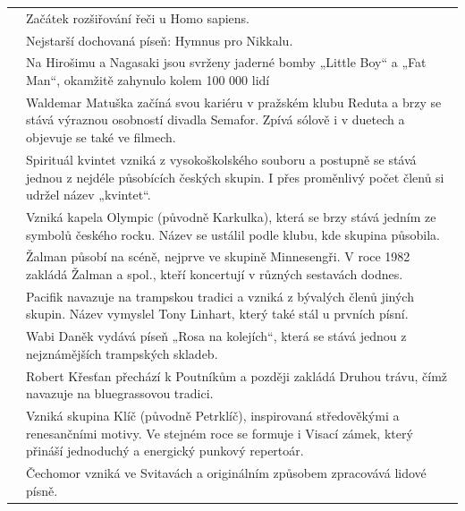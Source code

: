 
\renewcommand{\arraystretch}{0.7} 
\setlength{\extrarowheight}{15pt}  
\setlength{\tabcolsep}{10pt}


\small %
\begin{xltabular}{\textwidth}{>{\raggedleft}p{2cm}X}

{} & Začátek rozšiřování řeči u Homo sapiens. \\
{} & Nejstarší dochovaná píseň: Hymnus pro Nikkalu. \\
{} & Na Hirošimu a Nagasaki jsou svrženy jaderné bomby „Little Boy“ a „Fat Man“, okamžitě zahynulo kolem 100 000 lidí \\
{} & Waldemar Matuška začíná svou kariéru v pražském klubu Reduta a brzy se stává výraznou osobností divadla Semafor. Zpívá sólově i v duetech a objevuje se také ve filmech. \\
{} & Spirituál kvintet vzniká z vysokoškolského souboru a postupně se stává jednou z nejdéle působících českých skupin. I přes proměnlivý počet členů si udržel název „kvintet“. \\
{} & Vzniká kapela Olympic (původně Karkulka), která se brzy stává jedním ze symbolů českého rocku. Název se ustálil podle klubu, kde skupina působila. \\
{} & Žalman působí na scéně, nejprve ve skupině Minnesengři. V roce 1982 zakládá Žalman a spol., kteří koncertují v různých sestavách dodnes. \\
{} & Pacifik navazuje na trampskou tradici a vzniká z bývalých členů jiných skupin. Název vymyslel Tony Linhart, který také stál u prvních písní. \\
{} & Wabi Daněk vydává píseň „Rosa na kolejích“, která se stává jednou z nejznámějších trampských skladeb. \\
{} & Robert Křesťan přechází k Poutníkům a později zakládá Druhou trávu, čímž navazuje na bluegrassovou tradici. \\
{} & Vzniká skupina Klíč (původně Petrklíč), inspirovaná středověkými a renesančními motivy. Ve stejném roce se formuje i Visací zámek, který přináší jednoduchý a energický punkový repertoár. \\
{} & Čechomor vzniká ve Svitavách a originálním způsobem zpracovává lidové písně. \\

\end{xltabular}
